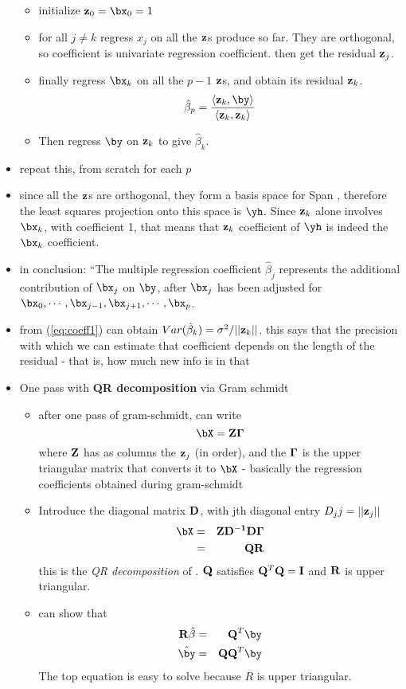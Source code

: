 \begin{itemize}
\begin{itemize}
       \item initialize ${\bf z}_0 = \bx_0 = 1$
       \item for all $j \neq k$ regress $x_j$ on all the ${\bf z}$s produce so far. They are orthogonal, so coefficient is univariate regression coefficient.
	 \subitem then get the residual ${\bf z}_j$. 
       \item finally regress $\bx_k$ on all the $p-1$ ${\bf z}$s, and obtain its residual ${\bf z}_k$.
	 \begin{equation}
	   \hat{\beta}_p = \frac{\langle {\bf z}_k, \by \rangle}{\langle {\bf z}_k, {\bf z}_k \rangle} \label{eq:coeff1}
	 \end{equation}
       \item Then regress $\by$ on ${\bf z}_k$ to give ${\hat{\beta}}_k$.
     \end{itemize}
   \item repeat this, from scratch for each $p$
   \item since all the ${\bf z}$s are orthogonal, they form a basis space for Span \bX, therefore the least squares projection onto this space is ${\yh}$. Since ${\bf z}_k$ alone involves $\bx_k$, with coefficient 1, that means that ${\bf z}_k$ coefficient of $\yh$ is indeed the $\bx_k$ coefficient.
   \item in conclusion: ``The multiple regression coefficient $\hat{\beta}_j$ represents the additional contribution of $\bx_j$ on $\by$, after $\bx_j$ has been adjusted for $\bx_0, \cdots, \bx_{j-1}, \bx_{j+1},\cdots,\bx_p$.
   \item from (\ref{eq:coeff1}) can obtain $Var(\hat{\beta}_k) = \sigma^2/||{\bf z}_k||$.
     \subitem this says that the precision with which we can estimate that coefficient depends on the length of the residual - that is, how much new info is in that 
   \item One pass with {\bf QR decomposition} via Gram schmidt
     \begin{itemize}
       \item after one pass of gram-schmidt, can write
	 $$ \bX = {\bf Z}{\bf \Gamma} $$
	where ${\bf Z}$ has as columns the ${\bf z}_j$ (in order), and the ${\bf \Gamma}$ is the upper triangular matrix that converts it to $\bX$ - basically the regression coefficients obtained during gram-schmidt
      \item Introduce the diagonal matrix ${\bf D}$, with jth diagonal entry $D_jj = ||{\bf z}_j||$
	\begin{eqnarray}
	  \bX &=& {\bf Z D^{-1} D \Gamma } \\
	   &=& {\bf QR}
	\end{eqnarray}
	this is the \emph{QR decomposition} of \bX. ${\bf Q}$ satisfies ${\bf Q}^T{\bf Q} = {\bf I}$ and ${\bf R}$ is upper triangular.
      \item can show that
	\begin{eqnarray}
	  {\bf R}\hat{\beta}  &=& {\bf Q}^T\by \\
	  \hat{\by} &=& {\bf QQ}^{T}\by
	\end{eqnarray}
	The top equation is easy to solve because $R$ is upper triangular.


\end{itemize}
\end{itemize}

